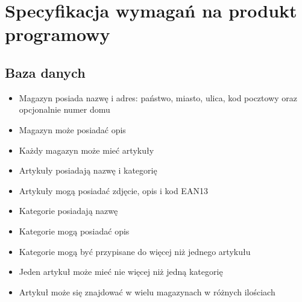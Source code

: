 \documentclass[../main.tex]{subfiles}
\begin{document}
\section{Specyfikacja wymagań na produkt programowy}
    \subsection{Baza danych}
        \begin{itemize}
            \item Magazyn posiada nazwę i adres: państwo, miasto, ulica, kod pocztowy oraz opcjonalnie numer domu 
            \item Magazyn może posiadać opis 
            \item Każdy magazyn może mieć artykuły
            \item Artykuły posiadają nazwę i kategorię
            \item Artykuły mogą posiadać zdjęcie, opis i kod EAN13
            \item Kategorie posiadają nazwę
            \item Kategorie mogą posiadać opis
            \item Kategorie mogą być przypisane do więcej niż jednego artykułu
            \item Jeden artykuł może mieć nie więcej niż jedną kategorię
            \item Artykuł może się znajdować w wielu magazynach w różnych ilościach
        \end{itemize}
        
\end{document}
